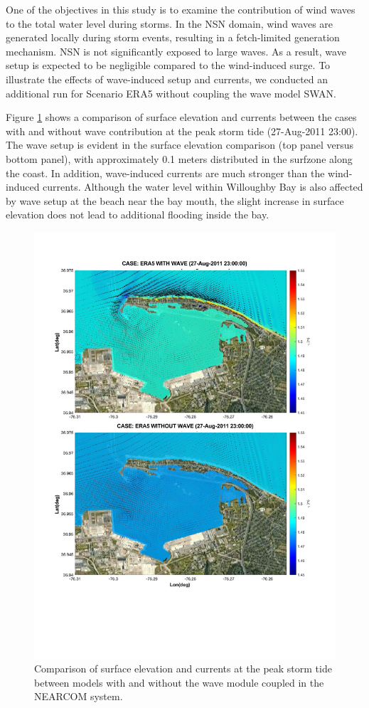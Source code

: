 \documentclass[11pt]{article}
\begin{document}
One of the objectives in this study is to examine the contribution of wind waves to the total water level during storms. In the NSN domain, wind waves are generated locally during storm events, resulting in a fetch-limited generation mechanism. NSN is not significantly exposed to large waves. As a result, wave setup is expected to be negligible compared to the wind-induced surge. To illustrate the effects of wave-induced setup and currents, we conducted an additional run for Scenario ERA5 without coupling the wave model SWAN.

 Figure \ref{ERA5_eta_wo_wave} shows a comparison of surface elevation and currents between the cases with and without wave contribution at the peak storm tide (27-Aug-2011 23:00). The wave setup is evident in the surface elevation comparison (top panel versus bottom panel), with approximately 0.1 meters distributed in the surfzone along the coast. In addition, wave-induced currents are much stronger than the wind-induced currents. Although the water level within Willoughby Bay is also affected by wave setup at the beach near the bay mouth, the slight increase in surface elevation does not lead to additional flooding inside the bay. 

\begin{figure}[h!]
\centering
\includegraphics[width=\textwidth]{./figures/nearcom_wo_wave.pdf}
\caption{Comparison of surface elevation and currents at the peak storm tide between models with and without the wave module coupled in the NEARCOM system.}
\label{ERA5_eta_wo_wave}
\centering
\end{figure}
\end{document}
